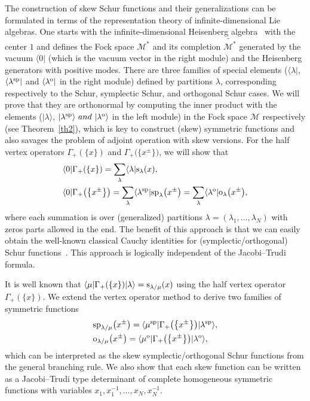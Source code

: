 \documentclass[pdftex]{sigma}
\numberwithin{equation}{section}
\begin{document}
The construction of skew Schur functions and their generalizations can be formulated in terms of the representation theory of infinite-dimensional Lie algebras.
One starts with the infinite-dimensional Heisenberg algebra~\cite{FK1980} with the center $1$ and defines the Fock space $\mathcal{M}^*$ and its completion $\widetilde{\mathcal{M}^*}$ generated by the vacuum $\langle0|$ (which is the vacuum vector in the right module) and the Heisenberg generators with positive modes. There are three families of special elements ($\langle\lambda|$, $\langle\lambda^{\rm sp}|$ and $\langle\lambda^{\rm o}|$
in the right module) defined by partitions $\lambda$, corresponding respectively to the Schur, symplectic Schur, and orthogonal Schur cases. We will prove that they are orthonormal by computing the inner product with the elements ($|\lambda\rangle$, $|\lambda^{\rm sp}\rangle~and~|\lambda^{\rm o}\rangle$ in the left module) in the Fock space $\mathcal{M}$ respectively (see Theorem~\ref{th2}), which is key to construct (skew) symmetric functions and also savages the problem of adjoint operation with skew versions. For the half vertex operators $\Gamma_+(\{x\})$ and $\Gamma_+\big(\big\{x^{\pm}\big\}\big)$, we will show that
\begin{align*}
&\langle 0|\Gamma_+(\{x\})=\sum_{\lambda}\langle \lambda|{\rm s}_\lambda(x),\\
&\langle 0|\Gamma_+\big(\big\{x^{\pm}\big\}\big)=\sum_{\lambda}\langle \lambda^{\rm sp}|{\rm sp}_\lambda\big(x^{\pm}\big)=\sum_{\lambda}\langle \lambda^{\rm o}|{\rm o}_\lambda\big(x^{\pm}\big),
\end{align*}
where each summation is over (generalized) partitions $\lambda=(\lambda_1,\dots,\lambda_N)$ with zeros parts allowed in the end. The benefit of this approach is that we can easily obtain the well-known classical Cauchy identities for (symplectic/orthogonal) Schur functions~\cite{KT1987,Su1990}. This approach is logically independent of the Jacobi--Trudi formula.

It is well known that $\langle \mu|\Gamma_+(\{x\})|\lambda\rangle={\rm s}_{\lambda/\mu}(x)$ \cite{Lam2006,Oko2001} using the half vertex operator
$\Gamma_+(\{x\})$. We extend the vertex operator method to derive two families of symmetric functions
\begin{align*}
&{\rm sp}_{\lambda/\mu}\big(x^{\pm}\big)=\langle\mu^{\rm sp}|\Gamma_+\big(\big\{x^{\pm}\big\}\big)|\lambda^{\rm sp}\rangle,\\
&{\rm o}_{\lambda/\mu}\big(x^{\pm}\big)=\langle\mu^{\rm o}|\Gamma_+\big(\big\{x^{\pm}\big\}\big)|\lambda^{\rm o}\rangle,
\end{align*}
which can be interpreted as the skew symplectic/orthogonal Schur functions from the general branching rule. We also show that each skew function can be written as a Jacobi--Trudi type determinant of complete homogeneous symmetric functions with variables $x_1,x^{-1}_1,\dots,x_N,x^{-1}_N$.
\end{document}
